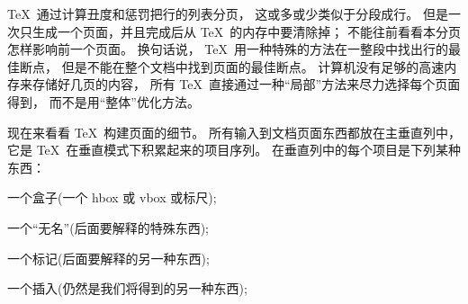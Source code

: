 \ninepoint
\danger \1\TeX\ 通过计算丑度和惩罚把行的列表分页，
这或多或少类似于分段成行。%
但是一次只生成一个页面，并且完成后从 \TeX\ 的内存中要清除掉；
不能往前看看本分页怎样影响前一个页面。%
换句话说， \TeX\ 用一种特殊的方法在一整段中找出行的最佳断点，
但是不能在整个文档中找到页面的最佳断点。%
计算机没有足够的高速内存来存储好几页的内容，
所有 \TeX\ 直接通过一种``局部''方法来尽力选择每个页面得到，
而不是用``整体''优化方法。

{}
\danger 现在来看看 \TeX\ 构建页面的细节。%
所有输入到文档页面东西都放在{主垂直列}中，
它是 \TeX\ 在垂直模式下积累起来的项目序列。%
在垂直列中的每个项目是下列某种东西：
\enddanger

\smallskip
\item\bull 一个盒子(一个 hbox 或 vbox 或标尺);

\item\bull 一个``无名''(后面要解释的特殊东西);

\item\bull 一个标记(后面要解释的另一种东西);

\item\bull 一个插入(仍然是我们将得到的另一种东西);

